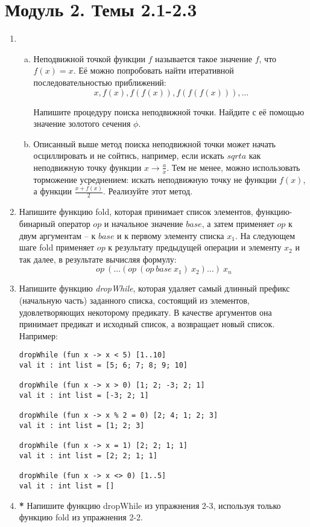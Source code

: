 \documentclass[a4paper,11pt]{article}
\begin{document}
\section*{Модуль 2. Темы 2.1-2.3}
\begin{enumerate}[{2-}1]
\item \begin{enumerate}[(a)]
\item Неподвижной точкой функции $f$ называется такое значение $f$, что 
$f(x) = x$. Её можно попробовать найти итеративной последовательностью
приближений:
\begin{equation*}
  x, f(x), f(f(x)), f(f(f(x))), \ldots
\end{equation*}

Напишите процедуру поиска неподвижной точки. Найдите с её помощью значение
золотого сечения $\phi$.

\item Описанный выше метод поиска неподвижной точки может начать осциллировать
и не сойтись, например, если искать $sqrt{a}$ как неподвижную точку функции
$x \rightarrow \frac{a}{x}$. Тем не менее, можно использовать торможение
усреднением: искать неподвижную точку не функции $f(x)$, а функции
$\frac{x+f(x)}{2}$. Реализуйте этот метод.
\end{enumerate}

\item Напишите функцию fold, которая принимает список элементов, 
функцию-бинарный оператор $op$ и начальное значение $base$, а затем применяет
$op$ к двум аргументам -- к $base$ и к первому элементу списка $x_1$. На
следующем шаге fold применяет $op$ к результату предыдущей операции и элементу
$x_2$ и так далее, в результате вычисляя формулу:
\begin{equation*}
  op~(\ldots (op~(op~base~x_1)~x_2) \ldots)~x_n
\end{equation*}

\item Напишите функцию \emph{dropWhile}, которая удаляет самый длинный префикс
(начальную часть) заданного списка, состоящий из элементов, удовлетворяющих
некоторому предикату. В качестве аргументов она принимает предикат и исходный
список, а возвращает новый список. Например:

\begin{lstlisting}
dropWhile (fun x -> x < 5) [1..10]
val it : int list = [5; 6; 7; 8; 9; 10]

dropWhile (fun x -> x > 0) [1; 2; -3; 2; 1]
val it : int list = [-3; 2; 1]

dropWhile (fun x -> x % 2 = 0) [2; 4; 1; 2; 3]
val it : int list = [1; 2; 3]

dropWhile (fun x -> x = 1) [2; 2; 1; 1]
val it : int list = [2; 2; 1; 1]

dropWhile (fun x -> x <> 0) [1..5]
val it : int list = []
\end{lstlisting}

\item \textbf{*} Напишите функцию dropWhile из упражнения 2-3, используя только
функцию fold из упражнения 2-2.
\end{enumerate}
\end{document}
